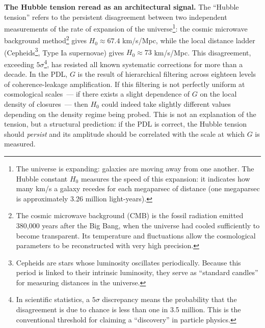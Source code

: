 \documentclass[12pt, a4paper, openright]{book}
\begin{document}
\textbf{The Hubble tension reread as an architectural signal.} The ``Hubble tension'' refers to the persistent disagreement between two independent measurements of the rate of expansion of the universe\footnote{The universe is expanding: galaxies are moving away from one another. The Hubble constant $H_0$ measures the speed of this expansion: it indicates how many km/s a galaxy recedes for each megaparsec of distance (one megaparsec is approximately 3.26 million light-years).}: the cosmic microwave background method\footnote{The cosmic microwave background (CMB) is the fossil radiation emitted 380,000 years after the Big Bang, when the universe had cooled sufficiently to become transparent. Its temperature and fluctuations allow the cosmological parameters to be reconstructed with very high precision.} gives $H_0 \approx 67.4$ km/s/Mpc, while the local distance ladder (Cepheids\footnote{Cepheids are stars whose luminosity oscillates periodically. Because this period is linked to their intrinsic luminosity, they serve as ``standard candles'' for measuring distances in the universe.}, Type Ia supernovae) gives $H_0 \approx 73$ km/s/Mpc. This disagreement, exceeding $5\sigma$\footnote{In scientific statistics, a $5\sigma$ discrepancy means the probability that the disagreement is due to chance is less than one in 3.5 million. This is the conventional threshold for claiming a ``discovery'' in particle physics.}, has resisted all known systematic corrections for more than a decade. In the PDL, $G$ is the result of hierarchical filtering across eighteen levels of coherence-leakage amplification. If this filtering is not perfectly uniform at cosmological scales~--- if there exists a slight dependence of $G$ on the local density of closures~--- then $H_0$ could indeed take slightly different values depending on the density regime being probed. This is not an explanation of the tension, but a structural prediction: if the PDL is correct, the Hubble tension should \emph{persist} and its amplitude should be correlated with the scale at which $G$ is measured.

\medskip
\end{document}
